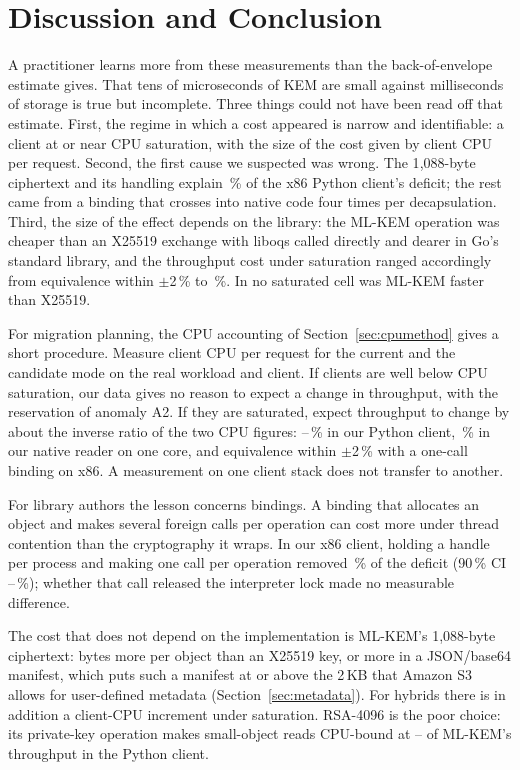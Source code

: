 \documentclass[review,12pt]{elsarticle}
\begin{document}
\section{Discussion and Conclusion}\label{sec:discussion}\label{sec:conclusion}
A practitioner learns more from these measurements than the back-of-envelope estimate gives. That tens of microseconds of KEM are
small against milliseconds of storage is true but incomplete. Three things could not have been
read off that estimate. First, the regime in which a cost appeared is narrow and identifiable:
a client at or near CPU saturation, with the size of the cost given by client CPU per request.
Second, the first cause we suspected was wrong. The 1{,}088-byte ciphertext and its handling
explain \AudPadShare\,\% of the x86 Python client's deficit; the rest came from a binding that
crosses into native code four times per decapsulation. Third, the size of the effect depends on
the library: the ML-KEM operation was cheaper than an X25519 exchange with liboqs called
directly and dearer in Go's standard library, and the throughput cost under saturation ranged
accordingly from equivalence within $\pm$2\,\% to \AudNOneMlkemDeficit\,\%. In no saturated cell
was ML-KEM faster than X25519.

For migration planning, the CPU accounting of Section~\ref{sec:cpumethod} gives a short
procedure. Measure client CPU per request for the current and the candidate mode on the real
workload and client. If clients are well below CPU saturation, our data gives no reason to
expect a change in throughput, with the reservation of anomaly A2. If they are saturated, expect
throughput to change by about the inverse ratio of the two CPU figures:
\RevHotDeficit--\ArmHotDeficit\,\% in our Python client, \AudNOneMlkemDeficit\,\% in our native
reader on one core, and equivalence within $\pm$2\,\% with a one-call binding on x86. A
measurement on one client stack does not transfer to another.

For library authors the lesson concerns bindings. A binding that allocates an object and makes several foreign calls
per operation can cost more under thread contention than the cryptography it wraps. In our x86
client, holding a handle per process and making one call per operation removed
\AudBindReleasedRemoved\,\% of the deficit (90\,\% CI
\AudBindReleasedRemovedLo--\AudBindReleasedRemovedHi\,\%); whether that call released the
interpreter lock made no measurable difference.

The cost that does not depend on the implementation is ML-KEM's
1{,}088-byte ciphertext: \RevMetaIntrinsic{} bytes more per object than an X25519 key, or
\RevMetaExtraMLKEM{} more in a JSON/base64 manifest, which puts such a manifest at or above the
2\,KB that Amazon S3 allows for user-defined metadata (Section~\ref{sec:metadata}). For hybrids
there is in addition a client-CPU increment under saturation. RSA-4096 is the poor choice: its
private-key operation makes small-object reads CPU-bound at \RevRsaGetLo--\RevRsaGetHi{} of
ML-KEM's throughput in the Python client.
\end{document}
